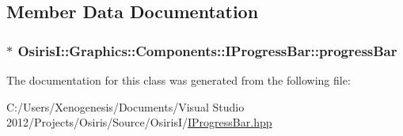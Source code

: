 \subsection{Member Data Documentation}
\hypertarget{class_osiris_i_1_1_graphics_1_1_components_1_1_i_progress_bar_a9ba973599ca82442d2933036399a2f2e}{
\subsubsection[{progress\-Bar}]{$\ast$ Osiris\-I\-::\-Graphics\-::\-Components\-::\-I\-Progress\-Bar\-::progress\-Bar\hspace{0.3cm}{\ttfamily [protected]}}}\label{class_osiris_i_1_1_graphics_1_1_components_1_1_i_progress_bar_a9ba973599ca82442d2933036399a2f2e}


The documentation for this class was generated from the following file\-:\begin{DoxyCompactItemize}
\item 
C\-:/\-Users/\-Xenogenesis/\-Documents/\-Visual Studio 2012/\-Projects/\-Osiris/\-Source/\-Osiris\-I/\hyperlink{_i_progress_bar_8hpp}{I\-Progress\-Bar.\-hpp}\end{DoxyCompactItemize}
